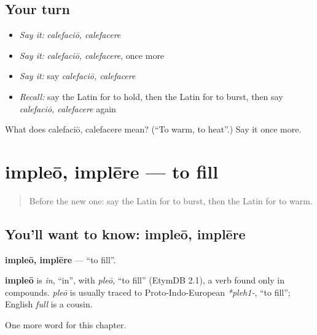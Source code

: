 \subsection*{Your turn}
\begin{itemize}
\raggedright
  \item \emph{Say it:} \emph{calefaciō, calefacere}
  \item \emph{Say it:} \emph{calefaciō, calefacere}, once more
  \item \emph{Say it:} say \emph{calefaciō, calefacere}
  \item \emph{Recall:} say the Latin for to hold, then the Latin for to burst, then say \emph{calefaciō, calefacere} again
\end{itemize}

\begin{tcolorbox}[breakable,colback=teal!4,colframe=teal!35!black,title={Before you move on}]
What does calefaciō, calefacere mean? (\textquotedblleft{}To warm, to heat\textquotedblright{}.) Say it once more.
\end{tcolorbox}
\section[impleō, implēre]{impleō, implēre — to fill}

\label{lesson:LA-C255-impleo}



\begin{quote}
Before the new one: say the Latin for to burst, then the Latin for to warm.
\end{quote}

\subsection*{You'll want to know: impleō, implēre}
\textbf{impleō, implēre} — \textquotedblleft{}to fill\textquotedblright{}.

\begin{cousinweb}
\textbf{impleō} is \emph{in}, \textquotedblleft{}in\textquotedblright{}, with \emph{pleō}, \textquotedblleft{}to fill\textquotedblright{} (EtymDB 2.1), a verb found only in compounds. \emph{pleō} is usually traced to Proto-Indo-European \emph{*pleh1-}, \textquotedblleft{}to fill\textquotedblright{}; English \emph{full} is a cousin.
\end{cousinweb}

\begin{grammarlens}[title={What you've built}]
One more word for this chapter.
\end{grammarlens}

